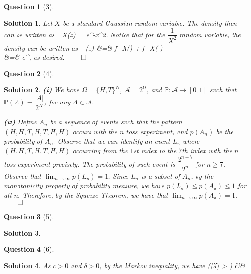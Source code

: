\documentclass{article} %
\def\eQb#1\eQe{\begin{eqnarray*}#1\end{eqnarray*}}
\theoremstyle{quest}
\newtheorem*{question}{Question}
\newtheorem*{solution}{Solution}
\begin{document}
\bigskip

\begin{question}[3]
\end{question}
\begin{solution}
Let $X$ be a standard Gaussian random variable. The density then
can be written as
\eQb
f_X(x) = e^{-x^2}.
\eQe
Notice that for the $\dfrac{1}{X^2}$ random variable, the density
can be written as
\eQb
f_{}(x) &=& f_{X}() 
+ f_{X}(-) \\
&=& e^{}, 
\eQe 
as desired. $\qed$

\end{solution}

\bigskip

\begin{question}[4]
\end{question}
\begin{solution}
\textbf{(i)} We have $\Omega = \{H,T \}^N$, $\mathscr{A} = 2^{\Omega}$,
and $\mathbb{P}:\mathscr{A} \to [0,1]$ such that 
$\mathbb{P}(A) = \dfrac{|A|}{2^N}$, for any $A \in \mathscr{A}$.

\smallskip

\textbf{(ii)} Define $A_n$ be a sequence of events such that
the pattern $(H,H,T,H,T,H,H)$ occurs with the $n$ toss experiment,
and $p(A_n)$ be the probability of $A_n$. Observe that we can identify
an event $L_n$ where 
$(H,H,T,H,T,H,H)$ occurring from the $1$st index to the $7$th
index with the $n$ toss experiment precisely. The probability of
such event is $\dfrac{2^{n-7}}{2^n}$ for $n \geq 7$. Observe that
$\lim_{n \to \infty} p(L_n) = 1$. Since $L_n$ is a subset of $A_n$,
by the monotonicity property of probability measure, we have
$p(L_n) \leq p(A_n) \leq 1$ for all $n$. Therefore, by the Squeeze 
Theorem, we have that $\lim_{n \to \infty} p(A_n) = 1$. $\qed$ 
 

\end{solution}

\bigskip

\begin{question}[5]
\end{question}
\begin{solution}

\end{solution}

\bigskip

\begin{question}[6]
\end{question}
\begin{solution}
As $c > 0$ and $\delta > 0$, by the Markov inequality, we have
\eQb
P(|X| > \delta) &\leq& 
\eQe
\end{solution}
\end{document}
